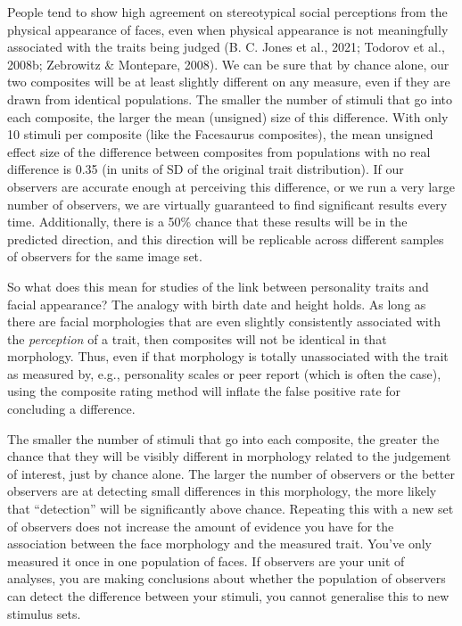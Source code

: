 \documentclass[
  man,floatsintext]{apa6}
\begin{document}
People tend to show high agreement on stereotypical social perceptions from the physical appearance of faces, even when physical appearance is not meaningfully associated with the traits being judged (B. C. Jones et al., 2021; Todorov et al., 2008b; Zebrowitz \& Montepare, 2008). We can be sure that by chance alone, our two composites will be at least slightly different on any measure, even if they are drawn from identical populations. The smaller the number of stimuli that go into each composite, the larger the mean (unsigned) size of this difference. With only 10 stimuli per composite (like the Facesaurus composites), the mean unsigned effect size of the difference between composites from populations with no real difference is 0.35 (in units of SD of the original trait distribution). If our observers are accurate enough at perceiving this difference, or we run a very large number of observers, we are virtually guaranteed to find significant results every time. Additionally, there is a 50\% chance that these results will be in the predicted direction, and this direction will be replicable across different samples of observers for the same image set.

So what does this mean for studies of the link between personality traits and facial appearance? The analogy with birth date and height holds. As long as there are facial morphologies that are even slightly consistently associated with the \emph{perception} of a trait, then composites will not be identical in that morphology. Thus, even if that morphology is totally unassociated with the trait as measured by, e.g., personality scales or peer report (which is often the case), using the composite rating method will inflate the false positive rate for concluding a difference.

The smaller the number of stimuli that go into each composite, the greater the chance that they will be visibly different in morphology related to the judgement of interest, just by chance alone. The larger the number of observers or the better observers are at detecting small differences in this morphology, the more likely that ``detection'' will be significantly above chance. Repeating this with a new set of observers does not increase the amount of evidence you have for the association between the face morphology and the measured trait. You've only measured it once in one population of faces. If observers are your unit of analyses, you are making conclusions about whether the population of observers can detect the difference between your stimuli, you cannot generalise this to new stimulus sets.
\end{document}
